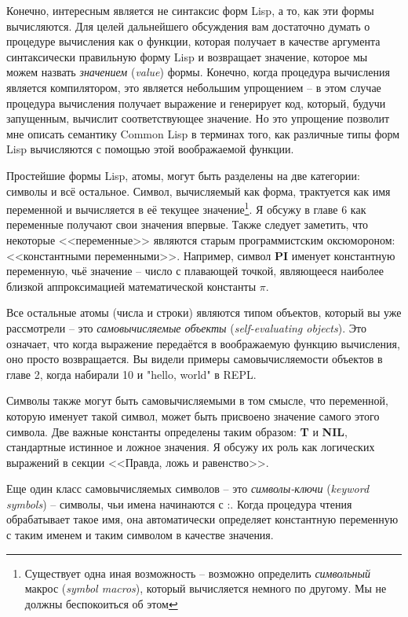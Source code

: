 Конечно, интересным является не синтаксис форм Lisp, а то, как эти формы вычисляются. Для
целей дальнейшего обсуждения вам достаточно думать о процедуре вычисления как о функции,
которая получает в качестве аргумента синтаксически правильную форму Lisp и возвращает
значение, которое мы можем назвать \textit{значением} (\textit{value}) формы. Конечно,
когда процедура вычисления является компилятором, это является небольшим упрощением -- в
этом случае процедура вычисления получает выражение и генерирует код, который, будучи
запущенным, вычислит соответствующее значение. Но это упрощение позволит мне описать
семантику Common Lisp в терминах того, как различные типы форм Lisp вычисляются с помощью
этой воображаемой функции.

Простейшие формы Lisp, атомы, могут быть разделены на две категории: символы и всё
остальное. Символ, вычисляемый как форма, трактуется как имя переменной и вычисляется в её
текущее значение\footnote{Существует одна иная возможность -- возможно определить
  \textit{символьный} макрос (\textit{symbol macros}), который вычисляется немного по
  другому. Мы не должны беспокоиться об этом}. Я обсужу в главе 6 как переменные получают
свои значения впервые. Также следует заметить, что некоторые <<переменные>> являются старым
программистским оксюмороном: <<константными переменными>>. Например, символ \textbf{PI}
именует константную переменную, чьё значение -- число с плавающей точкой, являющееся
наиболее близкой аппроксимацией математической константы $\pi$.

Все остальные атомы (числа и строки) являются типом объектов, который вы уже рассмотрели
-- это \textit{самовычисляемые объекты} (\textit{self-evaluating objects}). Это означает,
что когда выражение передаётся в воображаемую функцию вычисления, оно просто
возвращается. Вы видели примеры самовычисляемости объектов в главе 2, когда набирали 10 и
"hello, world" в REPL.

Символы также могут быть самовычисляемыми в том смысле, что переменной, которую именует
такой символ, может быть присвоено значение самого этого символа. Две важные константы
определены таким образом: \textbf{T} и \textbf{NIL}, стандартные истинное и ложное
значения. Я обсужу их роль как логических выражений в секции <<Правда, ложь и равенство>>.

Еще один класс самовычисляемых символов -- это \textit{символы-ключи} (\textit{keyword
  symbols}) -- символы, чьи имена начинаются с :. Когда процедура чтения обрабатывает
такое имя, она автоматически определяет константную переменную с таким именем и таким
символом в качестве значения.

